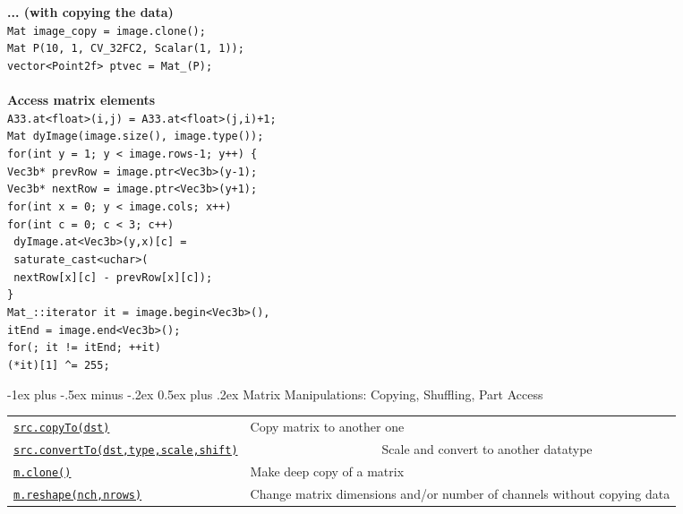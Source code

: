 \documentclass[10pt,landscape]{article}
\makeatletter
\renewcommand{\section}{\@startsection{section}{1}{0mm}%
                                {-1ex plus -.5ex minus -.2ex}%
                                {0.5ex plus .2ex}%
                                {\normalfont\large\bfseries}}
\makeatother
\begin{document}
\begin{multicols}{3}
\begin{tabbing}
\textbf{... (with copying the data)}\\
\> \texttt{Mat image\_copy = image.clone();}\\
\> \texttt{Mat P(10, 1, CV\_32FC2, Scalar(1, 1));}\\
\> \texttt{vector<Point2f> ptvec = Mat\_<Point2f>(P);}\\

\>\\
\textbf{Access matrix elements}\\
\> \texttt{A33.at<float>(i,j) = A33.at<float>(j,i)+1;}\\
\> \texttt{Mat dyImage(image.size(), image.type());}\\
\> \texttt{for(int y = 1; y < image.rows-1; y++) \{}\\
\> \> \texttt{Vec3b* prevRow = image.ptr<Vec3b>(y-1);}\\
\> \> \texttt{Vec3b* nextRow = image.ptr<Vec3b>(y+1);}\\
\> \> \texttt{for(int x = 0; y < image.cols; x++)}\\
\> \> \> \texttt{for(int c = 0; c < 3; c++)}\\
\> \> \> \texttt{  dyImage.at<Vec3b>(y,x)[c] =}\\
\> \> \> \texttt{    saturate\_cast<uchar>(}\\
\> \> \> \texttt{       nextRow[x][c] - prevRow[x][c]);}\\
\> \texttt{\} }\\
\> \texttt{Mat\_<Vec3b>::iterator it = image.begin<Vec3b>(),}\\
\> \> \texttt{itEnd = image.end<Vec3b>();}\\
\> \texttt{for(; it != itEnd; ++it)}\\
\> \> \texttt{(*it)[1] \textasciicircum{}= 255;}\\

\end{tabbing}

\section{Matrix Manipulations: Copying, Shuffling, Part Access}
\begin{tabular}{@{}p{\the\MyLen}%
                @{}p{\linewidth-\the\MyLen}@{}}
\texttt{\href{http://opencv.willowgarage.com/documentation/cpp/basic_structures.html\#Mat::copyTo}{src.copyTo(dst)}} & Copy matrix to another one \\
\texttt{\href{http://opencv.willowgarage.com/documentation/cpp/basic_structures.html\#Mat::convertTo}{src.convertTo(dst,type,scale,shift)}} & \ \ \ \ \ \ \ \ \ \ \ \ \ \ \ \ \ \ \ \ \ Scale and convert to another datatype \\
\texttt{\href{http://opencv.willowgarage.com/documentation/cpp/basic_structures.html\#Mat::clone}{m.clone()}} & Make deep copy of a matrix \\
\texttt{\href{http://opencv.willowgarage.com/documentation/cpp/basic_structures.html\#Mat::reshape}{m.reshape(nch,nrows)}} & Change matrix dimensions and/or number of channels without copying data \\


\end{tabular}
\end{multicols}
\end{document}
